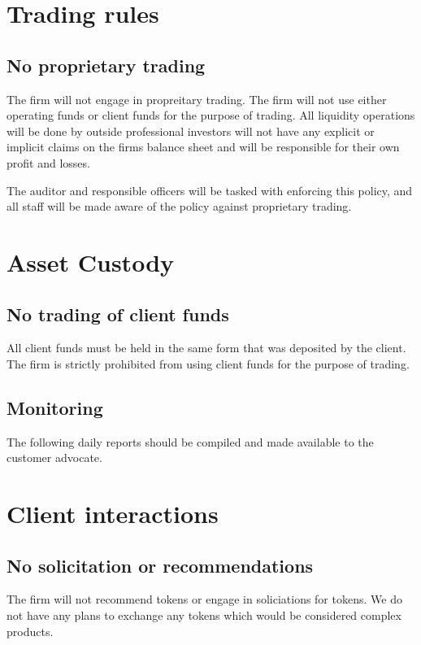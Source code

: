 \section{Trading rules}

\subsection{No proprietary trading}

The firm will not engage in propreitary trading.  The firm will not
use either operating funds or client funds for the purpose of
trading.  All liquidity operations will be done by outside
professional investors will not have any explicit or implicit claims
on the firms balance sheet and will be responsible for their own
profit and losses.

The auditor and responsible officers will be tasked with enforcing
this policy, and all staff will be made aware of the policy against
proprietary trading.

\section{Asset Custody}
\subsection{No trading of client funds}
All client funds must be held in the same form that was deposited by
the client.  The firm is strictly prohibited from using client funds
for the purpose of trading.

\subsection{Monitoring}

The following daily reports should be compiled and made available to
the customer advocate.

\section{Client interactions}
\subsection{No solicitation or recommendations}
The firm will not recommend tokens or engage in soliciations for
tokens.  We do not have any plans to exchange any tokens which would
be considered complex products.

